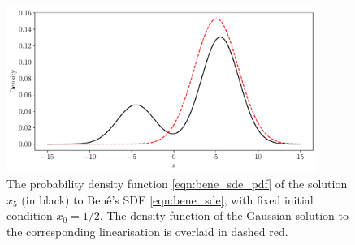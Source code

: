 \begin{figure}
	\centering
	\includegraphics[width=0.9\textwidth]{chp05_gmm/figures/bene_final_gauss_5.0.pdf}
	\caption{The probability density function \cref{eqn:bene_sde_pdf} of the solution \(x_5\) (in black) to Ben\^e's SDE \cref{eqn:bene_sde}, with fixed initial condition \(x_0 = 1/2\).
		The density function of the Gaussian solution to the corresponding linearisation is overlaid in dashed red.}
	\label{fig:bene_gauss}
\end{figure}

